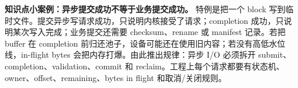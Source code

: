 \begin{casebox}
\textbf{知识点小案例：异步提交成功不等于业务提交成功。}
特例是把一个 block 写到临时文件。提交异步写请求成功，只说明内核接受了请求；completion 成功，只说明某次写入完成；业务提交还需要 checksum、rename 或 manifest 记录。若把 buffer 在 completion 前归还池子，设备可能还在使用旧内容；若没有高低水位线，in-flight bytes 会把内存打爆。由此推出规律：异步 I/O 必须拆开 submit、completion、validation、commit 和 reclaim。工程上每个请求都要有状态机、owner、offset、remaining、bytes in flight 和取消/关闭规则。
\end{casebox}
